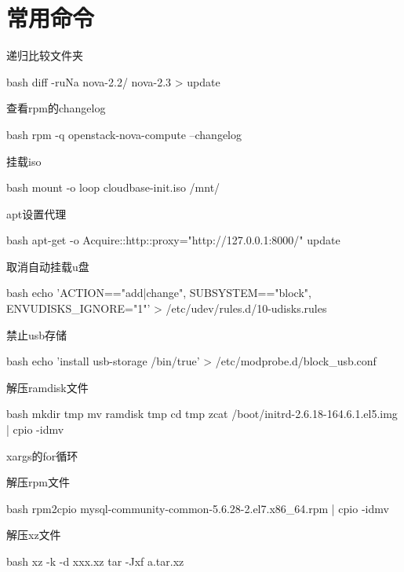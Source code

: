 \section{常用命令}
\begin{outline}[enumerate]
\1 递归比较文件夹
\begin{code-block}{bash}
diff -ruNa nova-2.2/ nova-2.3 > update
\end{code-block}

\1 查看rpm的changelog
\begin{code-block}{bash}
rpm -q openstack-nova-compute --changelog
\end{code-block}

\1 挂载iso
\begin{code-block}{bash}
mount -o loop cloudbase-init.iso /mnt/
\end{code-block}

\1 apt设置代理
\begin{code-block}{bash}
apt-get -o Acquire::http::proxy="http://127.0.0.1:8000/" update
\end{code-block}

\1 取消自动挂载u盘
\begin{code-block}{bash}
echo 'ACTION=="add|change", SUBSYSTEM=="block", ENV{UDISKS_IGNORE}="1"' > /etc/udev/rules.d/10-udisks.rules
\end{code-block}

\1 禁止usb存储
\begin{code-block}{bash}
echo 'install usb-storage /bin/true' > /etc/modprobe.d/block_usb.conf
\end{code-block}

\1 解压ramdisk文件
\begin{code-block}{bash}
mkdir tmp
mv ramdisk tmp
cd tmp
zcat /boot/initrd-2.6.18-164.6.1.el5.img | cpio -idmv
\end{code-block}

\1 xargs的for循环

\1 解压rpm文件
\begin{code-block}{bash}
rpm2cpio mysql-community-common-5.6.28-2.el7.x86_64.rpm | cpio -idmv
\end{code-block}

\1 解压xz文件
\begin{code-block}{bash}
xz -k -d xxx.xz
tar -Jxf a.tar.xz
\end{code-block}


\end{outline}
